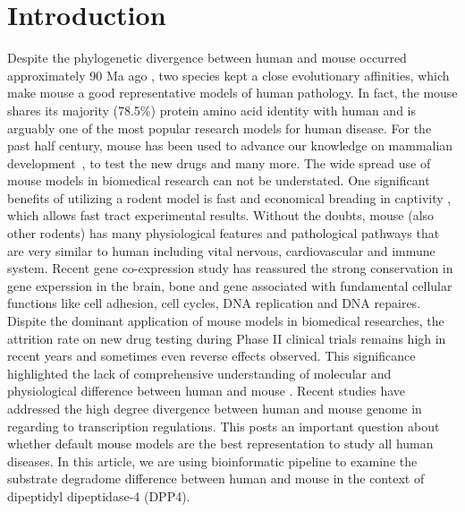 \section{Introduction}

Despite the phylogenetic divergence between human and mouse occurred approximately 90 Ma ago \cite{Hedges_2006}, two species kept a close evolutionary affinities, which make mouse a good representative models of human pathology. In fact, the mouse shares its majority (78.5\%) protein amino acid identity with human \cite{Lindblad_Toh_2001} and is arguably one of the most popular research models for human disease. For the past half century, mouse has been used to advance our knowledge on mammalian development~\cite{Ueda_2006, Cheon_2011}, to test the new drugs \cite{Van_Dam_2011} and many more. The wide spread use of mouse models in biomedical research can not be understated. \cite{MORSEIII_2007} One significant benefits of utilizing a rodent model is fast and economical breading in captivity \cite{Rosenthal_2007}, which allows fast tract experimental results. \cite{Vandamme_2014} Without the doubts, mouse (also other rodents) has many physiological features and pathological pathways that are very similar to human including vital nervous, cardiovascular and immune system. \cite{MORSEIII_2007,Rosenthal_2007} Recent gene co-expression study \cite{Monaco_2015} has reassured the strong conservation in gene experssion in the brain, bone and gene associated with fundamental cellular functions like cell adhesion, cell cycles, DNA replication and DNA repaires. \cite{Monaco_2015}
\\

Dispite the dominant application of mouse models in biomedical researches, the attrition rate on new drug testing during Phase II clinical trials remains high in recent years \cite{Arrowsmith_2011} and sometimes even reverse effects observed. This significance highlighted the lack of comprehensive understanding of molecular and physiological difference between human and mouse \cite{de_Magalh_es_2014}. Recent studies have addressed the high degree divergence between human and mouse genome in regarding to transcription regulations. \cite{25409824} This posts an important question about whether default mouse models are the best representation to study all human diseases. In this article, we are using bioinformatic pipeline to examine the substrate degradome difference between human and mouse in the context of dipeptidyl dipeptidase-4 (DPP4).  \\

